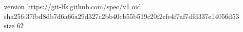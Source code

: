 version https://git-lfs.github.com/spec/v1
oid sha256:37fbd8db7d6a66a29d327c2bb40cb55b519c20f2cfe4f7af7dfd337e14056d53
size 62
